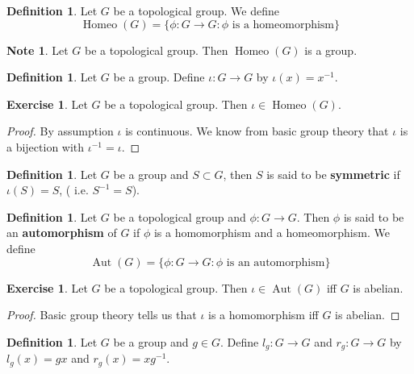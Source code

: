 \documentclass[12pt]{amsart}
\theoremstyle{definition}
\newtheorem{defn}[definition]{Definition}
\newtheorem{note}[definition]{Note}
\newtheorem{ex}[definition]{Exercise}
\newcommand{\tbf}[1]{\textbf{#1}}
\DeclareMathOperator{\Aut}{Aut}
\DeclareMathOperator{\Homeo}{Homeo}
\DeclareMathOperator*{\0}{\mbf{0}}
\DeclareMathOperator*{\1}{\mbf{1}}
\newcommand{\lex}[1]{\label{ex:#1}}
\newcommand{\ld}[1]{\label{defn:#1}}
\begin{document}
	\begin{defn} \ld{00000} 
		Let $G$ be a topological group. We define $$\Homeo(G) = \{\phi:G \rightarrow G: \phi \text{ is a homeomorphism}\}$$
	\end{defn}
	
	\begin{note}
	Let $G$ be a topological group. Then $\Homeo(G)$ is a group.
	\end{note}
	
	\begin{defn} \ld{00000} 
		Let $G$ be a group. Define $\iota:G \rightarrow G$ by $\iota(x) = x^{-1}$. 
	\end{defn}
	
	\begin{ex} \lex{00000} 
		Let $G$ be a topological group. Then $\iota \in \Homeo(G)$.
	\end{ex}

	\begin{proof}
		By assumption $\iota$ is continuous. We know from basic group theory that $\iota$ is a bijection with $\iota^{-1} = \iota$. 
	\end{proof}

	\begin{defn} \ld{00000} 
		Let $G$ be a group and $S \subset G$, then $S$ is said to be \tbf{symmetric} if $\iota(S) = S$, ( i.e. $S^{-1} = S$).
	\end{defn}
	
	\begin{defn} \ld{00000} 
		Let $G$ be a topological group and $\phi:G \rightarrow G$. Then $\phi$ is said to be an \tbf{automorphism} of $G$ if $\phi$ is a homomorphism and a homeomorphism. We define $$\Aut(G) = \{\phi:G \rightarrow G: \phi \text{ is an automorphism}\}$$
	\end{defn}
	
	\begin{ex} \lex{00000} 
	Let $G$ be a topological group. Then $\iota \in \Aut(G)$ iff $G$ is abelian. 
	\end{ex}
	
	\begin{proof}
	Basic group theory tells us that $\iota$ is a homomorphism iff $G$ is abelian.
	\end{proof}
	
	\begin{defn} \ld{00000} 
		Let $G$ be a group and $g \in G$. Define $l_g:G \rightarrow G$ and $r_g:G \rightarrow G$ by $l_g(x) = gx$ and $r_g(x) = xg^{-1}$. 
	\end{defn}
	
\end{document}

